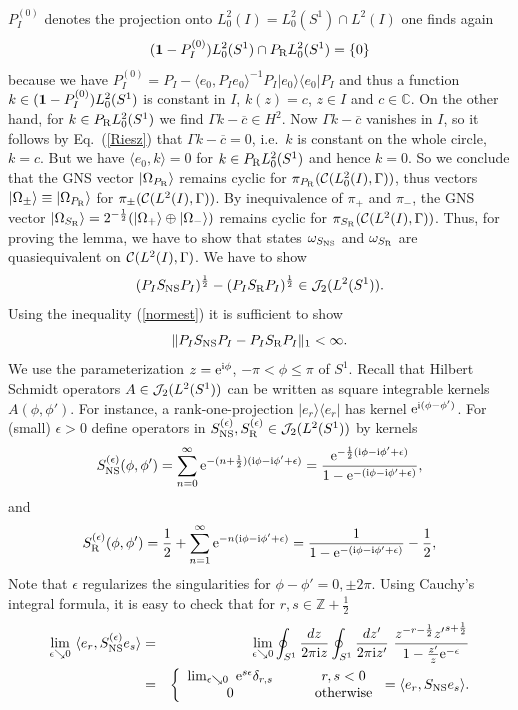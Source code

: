 \documentclass[10pt,a4paper]{article}
\begin{document}
$P_I^{(0)}$ denotes the projection onto
$L_0^2(I)=L_0^2(S^1)\cap L^2(I)$ one finds again
\[  ({\bf 1}-P_I^{(0)}) L_0^2(S^1) \cap P_{\rm R} L_0^2(S^1) =
\{0\} \]
because we have
$P_I^{(0)}=P_I-\langle e_0,P_I e_0\rangle^{-1}
P_I|e_0\rangle\langle e_0|P_I$ and thus a function
$k\in({\bf 1}-P_I^{(0)})L_0^2(S^1)$ is constant in $I$,
$k(z)=c$, $z\in I$ and $c\in\mathbb{C}$.
On the other hand, for $k\in P_{\rm R}L_0^2(S^1)$ we find
$\Gamma k - \overline{c}\in H^2$. Now $\Gamma k-\overline{c}$
vanishes in $I$, so it follows by Eq.~(\ref{Riesz})
that $\Gamma k-\overline{c}=0$, i.e.~$k$ is constant on the
whole circle, $k=c$. But we have $\langle e_0,k\rangle=0$ for
$k\in P_{\rm R}L_0^2(S^1)$ and hence $k=0$. So we conclude that
the GNS vector $|\Omega_{P_{\rm R}}\rangle$ remains cyclic for
$\pi_{P_{\rm R}}({\cal C}(L_0^2(I),\Gamma))$, thus
vectors $|\Omega_\pm\rangle\equiv|\Omega_{P_{\rm R}}\rangle$
for $\pi_\pm({\cal C}(L^2(I),\Gamma))$. By inequivalence of
$\pi_+$ and $\pi_-$, the GNS vector
$|\Omega_{S_{\rm R}}\rangle=2^{-\frac{1}{2}}(|\Omega_+\rangle
\oplus|\Omega_-\rangle)$ remains cyclic for
$\pi_{S_{\rm R}}({\cal C}(L^2(I),\Gamma))$. Thus, for proving
the lemma, we have to show that states
$\omega_{S_{\rm NS}}$ and $\omega_{S_{\rm R}}$ are quasiequivalent
on ${\cal C}(L^2(I),\Gamma)$. We have to show
\[ (P_IS_{\rm NS}P_I)^\frac{1}{2} - (P_IS_{\rm R}P_I)^\frac{1}{2}
\in {\cal J}_2(L^2(S^1)). \]
Using the inequality (\ref{normest}) it is
sufficient to show
\[ \|P_IS_{\rm NS}P_I-P_IS_{\rm R}P_I\|_1 < \infty. \]
We use the parameterization $z={\rm e}^{{\rm i}\phi}$,
$-\pi<\phi\le\pi$ of $S^1$. Recall that Hilbert
Schmidt operators $A\in{\cal J}_2(L^2(S^1))$ can be
written as square integrable kernels
$A(\phi,\phi')$. For instance, a rank-one-projection
$|e_r\rangle\langle e_r|$ has kernel ${\rm e}^{{\rm i}(\phi-\phi')}$.
For (small) $\epsilon>0$ define operators in
$S_{\rm NS}^{(\epsilon)},S_{\rm R}^{(\epsilon)}\in
{\cal J}_2(L^2(S^1))$ by kernels
\[ S_{\rm NS}^{(\epsilon)}(\phi,\phi') =
\sum_{n=0}^\infty
{\rm e}^{-(n+\frac{1}{2})({\rm i}\phi-{\rm i}\phi'+\epsilon)}=
\frac{{\rm e}^{-\frac{1}{2}({\rm i}\phi-{\rm i}\phi'+\epsilon)}}
{1-{\rm e}^{-({\rm i}\phi-{\rm i}\phi'+\epsilon)}}, \]
and
\[ S_{\rm R}^{(\epsilon)}(\phi,\phi') =
\frac{1}{2} + \sum_{n=1}^\infty
{\rm e}^{-n({\rm i}\phi-{\rm i}\phi'+\epsilon)}=
\frac{1}{1-{\rm e}^{-({\rm i}\phi-{\rm i}\phi'+\epsilon)}}-
\frac{1}{2}, \]
Note that $\epsilon$ regularizes the singularities
for $\phi-\phi'=0,\pm 2\pi$. Using Cauchy's integral
formula, it is easy to check that for
$r,s \in \mathbb{Z} + \frac{1}{2}$
\begin{eqnarray*}
\lim_{\epsilon\searrow 0} \,\, \langle e_r,
S_{\rm NS}^{(\epsilon)} e_s \rangle &=&
\lim_{\epsilon\searrow 0} \oint_{S^1}
\frac{dz}{2\pi{\rm i} z} \oint_{S^1} \frac{dz'}{2\pi{\rm i} z'}\,\,
\frac{z^{-r-\frac{1}{2}} {z'}^{s+\frac{1}{2}}}
{1-\frac{z'}{z} {\rm e}^{-\epsilon}} \\
&=& \left\{ \begin{array}{cc}
\lim_{\epsilon\searrow 0} \,\, {\rm e}^{s\epsilon}\delta_{r,s}
\qquad & r,s<0 \\ 0 \qquad & \mbox{otherwise}
\end{array} \right.
= \langle e_r, S_{\rm NS} e_s \rangle .
\end{eqnarray*}
\end{document}
